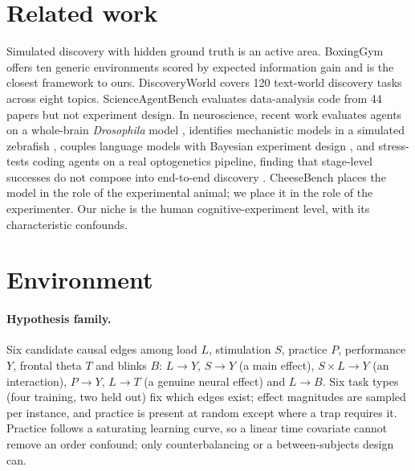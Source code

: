 \documentclass[11pt]{article}
\begin{document}
\section{Related work}
Simulated discovery with hidden ground truth is an active area.
BoxingGym \citep{gandhi2025boxinggym} offers ten generic environments scored by expected information gain and is the closest framework to ours.
DiscoveryWorld \citep{jansen2024discoveryworld} covers 120 text-world discovery tasks across eight topics.
ScienceAgentBench \citep{chen2025scienceagentbench} evaluates data-analysis code from 44 papers but not experiment design.
In neuroscience, recent work evaluates agents on a whole-brain \emph{Drosophila} model \citep{sinha2026digitalfly}, identifies mechanistic models in a simulated zebrafish \citep{lueckmann2026zebrafish}, couples language models with Bayesian experiment design \citep{murphy2026mda}, and stress-tests coding agents on a real optogenetics pipeline, finding that stage-level successes do not compose into end-to-end discovery \citep{horstmann2026casestudy}.
CheeseBench \citep{bugaud2026cheesebench} places the model in the role of the experimental animal; we place it in the role of the experimenter.
Our niche is the human cognitive-experiment level, with its characteristic confounds.

\section{Environment}
\paragraph{Hypothesis family.}
Six candidate causal edges among load $L$, stimulation $S$, practice $P$, performance $Y$, frontal theta $T$ and blinks $B$:
$L\!\to\!Y$, $S\!\to\!Y$ (a main effect), $S{\times}L\!\to\!Y$ (an interaction), $P\!\to\!Y$, $L\!\to\!T$ (a genuine neural effect) and $L\!\to\!B$.
Six task types (four training, two held out) fix which edges exist; effect magnitudes are sampled per instance, and practice is present at random except where a trap requires it.
Practice follows a saturating learning curve, so a linear time covariate cannot remove an order confound; only counterbalancing or a between-subjects design can.
\end{document}
